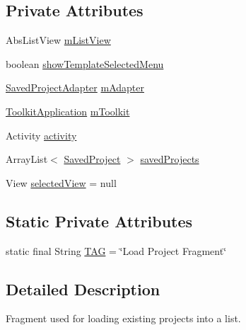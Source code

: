 \subsection*{Private Attributes}
\begin{DoxyCompactItemize}
\item 
Abs\+List\+View \hyperlink{classorg_1_1buildmlearn_1_1toolkit_1_1fragment_1_1LoadProjectFragment_a3e42689850030ceba9f4d8864c514a6a}{m\+List\+View}
\item 
boolean \hyperlink{classorg_1_1buildmlearn_1_1toolkit_1_1fragment_1_1LoadProjectFragment_a3e417a84219dc1ba90e09df5f3535b97}{show\+Template\+Selected\+Menu}
\item 
\hyperlink{classorg_1_1buildmlearn_1_1toolkit_1_1adapter_1_1SavedProjectAdapter}{Saved\+Project\+Adapter} \hyperlink{classorg_1_1buildmlearn_1_1toolkit_1_1fragment_1_1LoadProjectFragment_a3a1adaf3b98aaf3713efe6b8059c3a01}{m\+Adapter}
\item 
\hyperlink{classorg_1_1buildmlearn_1_1toolkit_1_1ToolkitApplication}{Toolkit\+Application} \hyperlink{classorg_1_1buildmlearn_1_1toolkit_1_1fragment_1_1LoadProjectFragment_a8eed05b138862fa7de2572d62d1db947}{m\+Toolkit}
\item 
Activity \hyperlink{classorg_1_1buildmlearn_1_1toolkit_1_1fragment_1_1LoadProjectFragment_a5583227995dcb9475a0a1f4b787a4553}{activity}
\item 
Array\+List$<$ \hyperlink{classorg_1_1buildmlearn_1_1toolkit_1_1model_1_1SavedProject}{Saved\+Project} $>$ \hyperlink{classorg_1_1buildmlearn_1_1toolkit_1_1fragment_1_1LoadProjectFragment_a4c085fb2467675412094cb68ca1f2d8a}{saved\+Projects}
\item 
View \hyperlink{classorg_1_1buildmlearn_1_1toolkit_1_1fragment_1_1LoadProjectFragment_a8afa416416dcec1d719e0ce7b5836cf8}{selected\+View} = null
\end{DoxyCompactItemize}
\subsection*{Static Private Attributes}
\begin{DoxyCompactItemize}
\item 
static final String \hyperlink{classorg_1_1buildmlearn_1_1toolkit_1_1fragment_1_1LoadProjectFragment_a99d74143504259fcd70442cd20b38bde}{T\+AG} = \char`\"{}Load Project Fragment\char`\"{}
\end{DoxyCompactItemize}


\subsection{Detailed Description}
Fragment used for loading existing projects into a list. 

